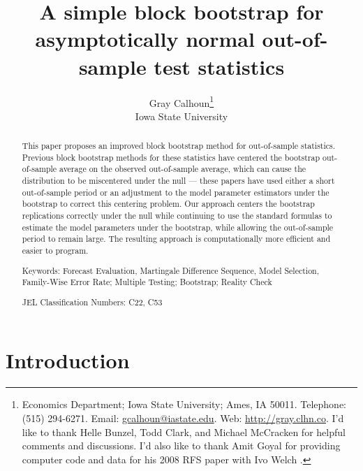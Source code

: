 \documentclass[12pt,fleqn]{article}
\begin{document}
\author{Gray Calhoun\thanks{ Economics Department; Iowa State
    University; Ames, IA 50011.  Telephone: (515) 294-6271.  Email:
    \guillemotleft\protect\url{gcalhoun@iastate.edu}\guillemotright.  Web:
    \guillemotleft\protect\url{http://gray.clhn.co}\guillemotright.  I'd like to
    thank Helle Bunzel, Todd Clark, and Michael McCracken
    for helpful comments and discussions.  I'd also like to thank Amit
    Goyal for providing computer code and data for his 2008
    RFS paper with Ivo
    Welch \citep{GoW:08}.} \\
  Iowa State University}

\title{A simple block bootstrap for asymptotically normal
  out-of-sample test statistics}

\maketitle

\begin{abstract} \noindent%
  This paper proposes an improved block bootstrap method for
  out-of-sample statistics. Previous block bootstrap methods for these
  statistics have centered the bootstrap out-of-sample average on the
  observed out-of-sample average, which can cause the distribution to
  be miscentered under the null --- these papers have used either a
  short out-of-sample period or an adjustment to the model parameter
  estimators under the bootstrap to correct this centering
  problem. Our approach centers the bootstrap replications correctly
  under the null while continuing to use the standard formulas to
  estimate the model parameters under the bootstrap, while allowing
  the out-of-sample period to remain large. The resulting approach is
  computationally more efficient and easier to program.

\strut

\noindent Keywords: Forecast Evaluation, Martingale Difference
Sequence, Model Selection, Family-Wise Error Rate; Multiple Testing;
Bootstrap; Reality Check

\strut

\noindent JEL Classification Numbers: C22, C53

\end{abstract}

\newpage

\section{Introduction}
\end{document}
